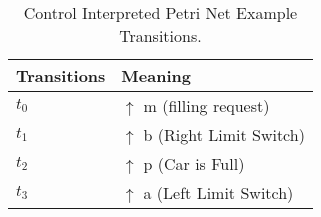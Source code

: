 \begin{table}[H]
\caption{Control Interpreted Petri Net Example Transitions.}
\centering
\begin{tabular}{M{5cm}M{10cm}}
Transitions & Meaning\\
\hline
\hyperlink{cipnExampleNet:t0}{\hypertarget{cipnExampleTable:t0}{$t_{0}$}} & \(\uparrow\) m (filling request)\\
\hyperlink{cipnExampleNet:t1}{\hypertarget{cipnExampleTable:t1}{$t_{1}$}} & \(\uparrow\) b (Right Limit Switch)\\
\hyperlink{cipnExampleNet:t2}{\hypertarget{cipnExampleTable:t2}{$t_{2}$}} & \(\uparrow\) p (Car is Full)\\
\hyperlink{cipnExampleNet:t3}{\hypertarget{cipnExampleTable:t3}{$t_{3}$}} & \(\uparrow\) a (Left Limit Switch)\\
\end{tabular}
\end{table}
